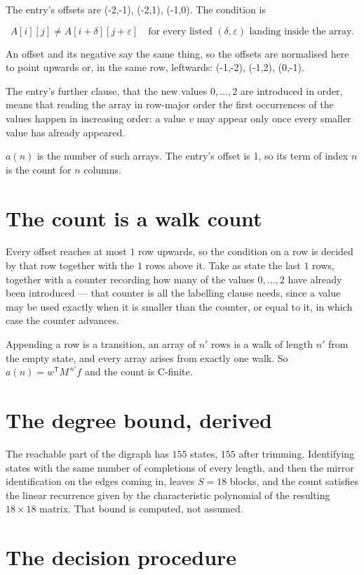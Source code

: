\documentclass[11pt]{article}
\theoremstyle{definition}
\begin{document}
The entry's offsets are (-2,-1), (-2,1), (-1,0). The condition is

\[A[i][j] \ne A[i{+}\delta][j{+}\varepsilon]\quad\text{for every listed }(\delta,\varepsilon)\text{ landing inside the array.}\]

An offset and its negative say the same thing, so the offsets are normalised here to point upwards or, in the same row, leftwards: (-1,-2), (-1,2), (0,-1).

The entry's further clause, that the new values $0,\dots,2$ are introduced in order, means that reading the array in row-major order the first occurrences of the values happen in increasing order: a value $v$ may appear only once every smaller value has already appeared.

$a(n)$ is the number of such arrays. The entry's offset is 1, so its term of index $n$ is the count for $n$ columns.

\section{The count is a walk count}

Every offset reaches at most $1$ row upwards, so the condition on a row is decided by that row together with the $1$ rows above it. Take as state the last $1$ rows, together with a counter recording how many of the values $0,\dots,2$ have already been introduced --- that counter is all the labelling clause needs, since a value may be used exactly when it is smaller than the counter, or equal to it, in which case the counter advances.

Appending a row is a transition, an array of $n'$ rows is a walk of length $n'$ from the empty state, and every array arises from exactly one walk. So $a(n) = w^{\mathsf T}M^{\,n'}f$ and the count is C-finite.

\section{The degree bound, derived}

The reachable part of the digraph has $155$ states, $155$ after trimming. Identifying states with the same number of completions of every length, and then the mirror identification on the edges coming in, leaves $S = 18$ blocks, and the count satisfies the linear recurrence given by the characteristic polynomial of the resulting $18\times18$ matrix. That bound is computed, not assumed.

\section{The decision procedure}
\end{document}
